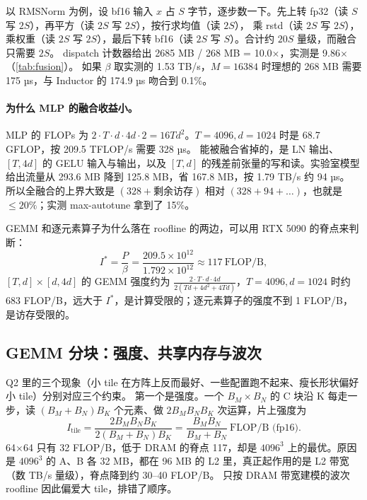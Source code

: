 \documentclass[11pt,a4paper]{ctexart}
\begin{document}
以 RMSNorm 为例，设 bf16 输入 $x$ 占 $S$ 字节，逐步数一下。先上转 fp32（读 $S$ 写 $2S$），再平方（读 $2S$ 写 $2S$），按行求均值（读 $2S$），
乘 rstd（读 $2S$ 写 $2S$），乘权重（读 $2S$ 写 $2S$），最后下转 bf16（读 $2S$ 写 $S$）。合计约 $20S$ 量级，而融合只需要 $2S$。
dispatch 计数器给出 2685 MB / 268 MB = 10.0$\times$，实测是 9.86$\times$（\cref{tab:fusion}）。
如果 $\beta$ 取实测的 1.53 TB/s，$M{=}16384$ 时理想的 268 MB 需要 175 µs，与 Inductor 的 174.9 µs 吻合到 0.1\%。

\paragraph{为什么 MLP 的融合收益小。}MLP 的 FLOPs 为 $2\cdot T\cdot d\cdot 4d\cdot 2 = 16Td^2$。$T{=}4096,d{=}1024$ 时是 68.7 GFLOP，按 209.5 TFLOP/s 需要 328 µs。
能被融合省掉的，是 LN 输出、$[T,4d]$ 的 GELU 输入与输出，以及 $[T,d]$ 的残差前张量的写和读。实验室模型给出流量从 293.6 MB 降到 125.8 MB，省 167.8 MB，按 1.79 TB/s 约 94 µs。
所以全融合的上界大致是 $(328+\text{剩余访存})$ 相对 $(328+94+\dots)$，也就是 $\le 20\%$；实测 max-autotune 拿到了 15\%。

GEMM 和逐元素算子为什么落在 roofline 的两边，可以用 RTX 5090 的脊点来判断：
\begin{equation}
I^{*}=\frac{P}{\beta}=\frac{209.5\times10^{12}}{1.792\times10^{12}}\approx 117\ \text{FLOP/B},
\end{equation}
$[T,d]\times[d,4d]$ 的 GEMM 强度约为 $\frac{2\cdot T\cdot d\cdot 4d}{2(Td+4d^2+4Td)}$，$T{=}4096,d{=}1024$ 时约 683 FLOP/B，远大于 $I^*$，是计算受限的；逐元素算子的强度不到 1 FLOP/B，是访存受限的。

\subsection{GEMM 分块：强度、共享内存与波次}

Q2 里的三个现象（小 tile 在方阵上反而最好、一些配置跑不起来、瘦长形状偏好小 tile）分别对应三个约束。
第一个是强度。一个 $B_M\times B_N$ 的 C 块沿 K 每走一步，读 $(B_M+B_N)B_K$ 个元素、做 $2B_MB_NB_K$ 次运算，片上强度为
\begin{equation}
I_{\text{tile}}=\frac{2B_MB_NB_K}{2(B_M+B_N)B_K}=\frac{B_MB_N}{B_M+B_N}\ \text{FLOP/B (fp16)}.
\end{equation}
64$\times$64 只有 32 FLOP/B，低于 DRAM 的脊点 117，却是 $4096^3$ 上的最优。原因是 $4096^3$ 的 A、B 各 32 MB，都在 96 MB 的 L2 里，真正起作用的是 L2 带宽（数 TB/s 量级），脊点降到约 30--40 FLOP/B。
只按 DRAM 带宽建模的波次 roofline 因此偏爱大 tile，排错了顺序。
\end{document}
